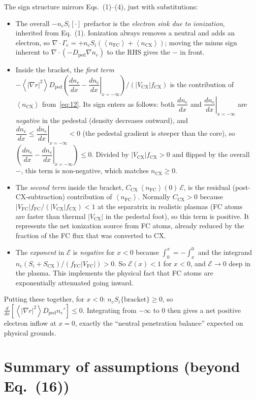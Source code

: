 \documentclass[11pt]{article}
\renewcommand{\ne}{n_{e}}  %
\newcommand{\nfc}{n_{\mathrm{FC}}}
\newcommand{\ncx}{n_{\mathrm{CX}}}
\newcommand{\Vfc}{\lvert V_{\mathrm{FC}}\rvert}
\newcommand{\Vcx}{\lvert V_{\mathrm{CX}}\rvert}
\newcommand{\Si}{S_{i}}
\newcommand{\Scx}{S_{\mathrm{CX}}}
\newcommand{\Dped}{D_{\mathrm{ped}}}
\newcommand{\fFC}{f_{\mathrm{FC}}}
\newcommand{\fCX}{f_{\mathrm{CX}}}
\newcommand{\fsa}[1]{\left\langle #1 \right\rangle}
\newcommand{\gradrsq}{\fsa{|\nabla r|^{2}}}
\newcommand{\neginf}{x=-\infty}
\newcommand{\dneneg}{\left.\dfrac{d\ne}{dx}\right|_{\neginf}}
\newcommand{\dnexnow}{\dfrac{d\ne}{dx}}
\newcommand{\nFCzero}{\fsa{\nfc}(0)}
\newcommand{\Ccx}{C_{\mathrm{CX}}}
\begin{document}
The sign structure mirrors Eqs.~(1)--(4), just with substitutions:
\begin{itemize}
  \item The overall $-\ne\Si[\cdot]$ prefactor is the \emph{electron sink
        due to ionization}, inherited from Eq.~(1).  Ionization always
        removes a neutral and adds an electron, so
        $\nabla\cdot\Gamma_{e}=+\ne\Si(\fsa{\nfc}+\fsa{\ncx})$; moving
        the minus sign inherent to $\nabla\cdot(-\Dped\nabla\ne)$ to the
        RHS gives the $-$ in front.
  \item Inside the bracket, the \emph{first term} $-\gradrsq\Dped(\dnexnow-\dneneg)/(\Vcx\fCX)$
        is the contribution of $\fsa{\ncx}$ from~\eqref{eq:12}.  Its
        sign enters as follows:  both $\dnexnow$ and $\dneneg$ are
        \emph{negative} in the pedestal (density decreases outward), and
        $\dnexnow \le \dneneg < 0$ (the pedestal gradient is steeper
        than the core), so $(\dnexnow-\dneneg)\le 0$.  Divided by
        $\Vcx\fCX>0$ and flipped by the overall $-$, this term is
        non-negative, which matches $\ncx\ge 0$.
  \item The \emph{second term} inside the bracket,
        $\Ccx\,\nFCzero\,\mathcal{E}$, is the residual (post-CX-subtraction)
        contribution of $\fsa{\nfc}$.  Normally $\Ccx>0$ because
        $\Vfc\fFC/(\Vcx\fCX)<1$ at the separatrix in realistic plasmas
        (FC atoms are faster than thermal $\Vcx$ in the pedestal foot),
        so this term is positive.  It represents the net ionization
        source from FC atoms, already reduced by the fraction of the FC
        flux that was converted to CX.
  \item The \emph{exponent} in $\mathcal{E}$ is \emph{negative} for $x<0$
        because $\int_{0}^{x}=-\int_{x}^{0}$ and the integrand
        $\ne(\Si+\Scx)/(\fFC\Vfc)>0$.  So $\mathcal{E}(x)<1$ for $x<0$,
        and $\mathcal{E}\to 0$ deep in the plasma.  This implements the
        physical fact that FC atoms are exponentially attenuated going
        inward.
\end{itemize}
Putting these together, for $x<0$:
$\ne\Si\{\text{bracket}\}\ge 0$, so
$\tfrac{d}{dx}[\gradrsq\Dped\ne']\le 0$.  Integrating from $-\infty$ to
$0$ then gives a net positive electron inflow at $x=0$, exactly the
``neutral penetration balance'' expected on physical grounds.

\section{Summary of assumptions (beyond Eq.~(16))}
\label{sec:assumptions}
\end{document}
